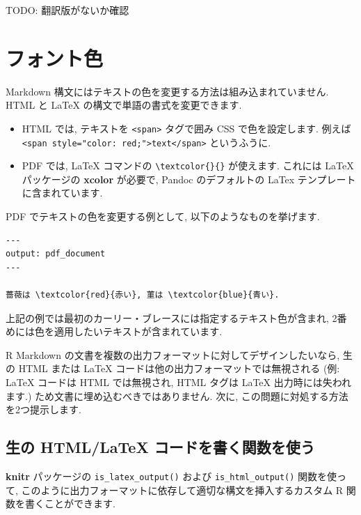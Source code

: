 \documentclass[
  11pt,
]{bxjsreport}
\begin{document}
TODO: 翻訳版がないか確認

\hypertarget{font-color}{%
\section{フォント色}\label{font-color}}

Markdown 構文にはテキストの色を変更する方法は組み込まれていません. HTML と LaTeX の構文で単語の書式を変更できます.

\begin{itemize}
\item
  HTML では, テキストを \texttt{\textless{}span\textgreater{}} タグで囲み CSS で色を設定します. 例えば \texttt{\textless{}span\ style="color:\ red;"\textgreater{}text\textless{}/span\textgreater{}} というふうに.
\item
  PDF では, LaTeX コマンドの \texttt{\textbackslash{}textcolor\{\}\{\}} が使えます. これには LaTeX パッケージの \textbf{xcolor} が必要で, Pandoc のデフォルトの LaTex テンプレートに含まれています.
\end{itemize}

PDF でテキストの色を変更する例として, 以下のようなものを挙げます.

\begin{verbatim}
---
output: pdf_document
---

薔薇は \textcolor{red}{赤い}, 菫は \textcolor{blue}{青い}.
\end{verbatim}

上記の例では最初のカーリー・ブレースには指定するテキスト色が含まれ, 2番めには色を適用したいテキストが含まれています.

R Markdown の文書を複数の出力フォーマットに対してデザインしたいなら, 生の HTML または LaTeX コードは他の出力フォーマットでは無視される (例: LaTeX コードは HTML では無視され, HTML タグは LaTeX 出力時には失われます.) ため文書に埋め込むべきではありません. 次に, この問題に対処する方法を2つ提示します.

\hypertarget{using-an-r-function-to-write-raw-html-or-latex-code}{%
\subsection{生の HTML/LaTeX コードを書く関数を使う}\label{using-an-r-function-to-write-raw-html-or-latex-code}}

\textbf{knitr}  パッケージの \texttt{is\_latex\_output()} および \texttt{is\_html\_output()} 関数を使って, このように出力フォーマットに依存して適切な構文を挿入するカスタム R 関数を書くことができます.
\end{document}
